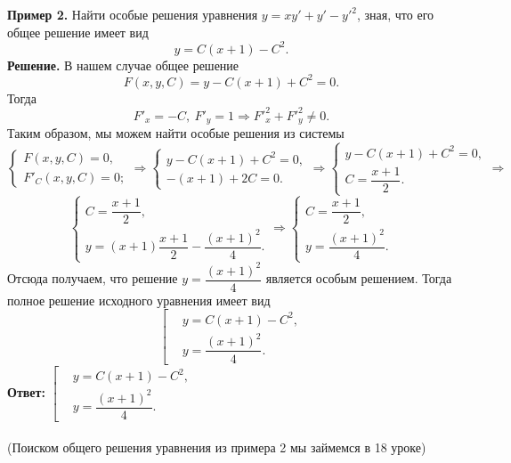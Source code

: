 \documentclass[a4paper, 12pt]{article}
\begin{document}
\textbf{Пример 2.} Найти особые решения уравнения $y = xy' + y' - y'^2$, зная, что его общее решение имеет вид $$y = C(x+1) - C^2.$$
\textbf{Решение.} В нашем случае общее решение $$F(x,y,C) = y - C(x+1) + C^2 = 0.$$
Тогда $$F'_x = -C,\ F'_y = 1 \Rightarrow F'^2_x + F'^2_y \ne 0.$$
Таким образом, мы можем найти особые решения из системы $$\begin{cases}
	F(x,y,C) = 0,\\
	F'_C(x,y,C) = 0;
\end{cases}\Rightarrow \begin{cases}
	y - C(x+1) + C^2 = 0,\\
	-(x+1) + 2C = 0.
\end{cases} \Rightarrow\begin{cases}
y - C(x+1) + C^2 = 0,\\
C = \dfrac{x+1}{2}.
\end{cases}\Rightarrow$$ $$\begin{cases}
C = \dfrac{x+1}{2},\\
y = (x+1)\dfrac{x+1}{2} - \dfrac{(x+1)^2}{4}.
\end{cases}\Rightarrow \begin{cases}
C = \dfrac{x+1}{2},\\
y = \dfrac{(x+1)^2}{4}.
\end{cases} $$
Отсюда получаем, что решение $y = \dfrac{(x+1)^2}{4}$ является особым решением. Тогда полное решение исходного уравнения имеет вид $$\left[\begin{aligned}
	&y = C(x+1) - C^2,\\
	&y = \dfrac{(x+1)^2}{4}.
\end{aligned}\right.$$
\textbf{Ответ:} $\left[\begin{aligned}
	&y = C(x+1) - C^2,\\
	&y = \dfrac{(x+1)^2}{4}.
\end{aligned}\right.$\\\\
(Поиском общего решения уравнения из примера 2 мы займемся в 18 уроке)
\end{document}
